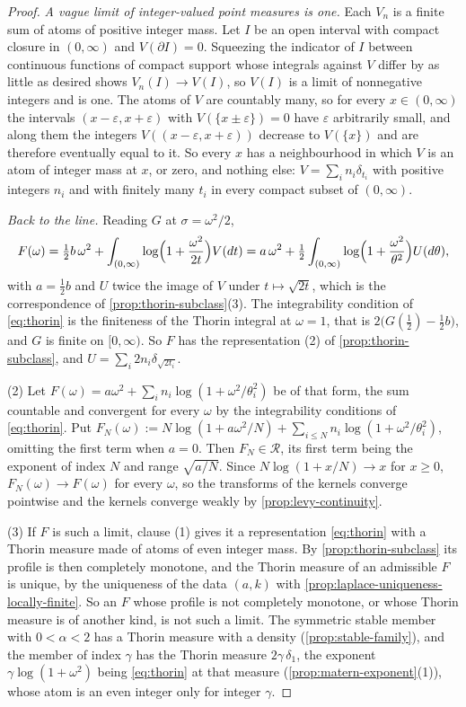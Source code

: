 \begin{proof}
\emph{A vague limit of integer-valued point measures is one.} Each $V_n$ is a finite sum of atoms
of positive integer mass. Let $I$ be an open interval with compact closure in $(0,\infty)$ and
$V(\partial I) = 0$. Squeezing the indicator of $I$ between continuous functions of compact
support whose integrals against $V$ differ by as little as desired shows $V_n(I) \to V(I)$, so
$V(I)$ is a limit of nonnegative integers and is one. The atoms of $V$ are countably many, so
for every $x \in (0,\infty)$ the intervals $(x - \varepsilon, x + \varepsilon)$ with
$V(\{x \pm \varepsilon\}) = 0$ have $\varepsilon$ arbitrarily small, and along them the integers
$V((x-\varepsilon,x+\varepsilon))$ decrease to $V(\{x\})$ and are therefore eventually equal to
it. So every $x$ has a neighbourhood in which $V$ is an atom of integer mass at $x$, or zero,
and nothing else: $V = \sum_i n_i\delta_{t_i}$ with positive integers $n_i$ and with finitely
many $t_i$ in every compact subset of $(0,\infty)$.

\emph{Back to the line.} Reading $G$ at $\sigma = \omega^2/2$,
\[
  F(\omega) = \tfrac12 b\,\omega^2 + \int_{(0,\infty)}\log\Bigl(1 + \frac{\omega^2}{2t}\Bigr)V(dt)
   = a\,\omega^2 + \tfrac12\int_{(0,\infty)}\log\Bigl(1 + \frac{\omega^2}{\theta^2}\Bigr)U(d\theta),
\]
with $a = \tfrac12 b$ and $U$ twice the image of $V$ under $t \mapsto \sqrt{2t}$, which is the
correspondence of \ref{prop:thorin-subclass}(3). The integrability condition of \ref{eq:thorin} is
the finiteness of the Thorin integral at $\omega = 1$, that is $2\bigl(G(\tfrac12) -
\tfrac12b\bigr)$, and $G$ is finite on $[0,\infty)$. So $F$ has the representation (2) of
\ref{prop:thorin-subclass}, and $U = \sum_i 2n_i\delta_{\sqrt{2t_i}}$.

(2) Let $F(\omega) = a\omega^2 + \sum_i n_i\log(1 + \omega^2/\theta_i^2)$ be of that form, the sum
countable and convergent for every $\omega$ by the integrability conditions of \ref{eq:thorin}.
Put $F_N(\omega) := N\log(1 + a\omega^2/N) + \sum_{i \le N} n_i\log(1 + \omega^2/\theta_i^2)$,
omitting the first term when $a = 0$. Then $F_N \in \mathcal{R}$, its first term being the
\Matern{} exponent of index $N$ and range $\sqrt{a/N}$. Since $N\log(1 + x/N) \to x$ for
$x \ge 0$, $F_N(\omega) \to F(\omega)$ for every $\omega$, so the transforms of the kernels
converge pointwise and the kernels converge weakly by \ref{prop:levy-continuity}.

(3) If $F$ is such a limit, clause (1) gives it a representation \ref{eq:thorin} with a Thorin
measure made of atoms of even integer mass. By \ref{prop:thorin-subclass} its profile is then
completely monotone, and the Thorin measure of an admissible $F$ is unique, by the uniqueness
of the data $(a,k)$ with \ref{prop:laplace-uniqueness-locally-finite}. So an $F$ whose profile
is not completely monotone, or whose Thorin measure is of another kind, is not such a limit.
The symmetric stable member with $0 < \alpha < 2$ has a Thorin measure with a density
(\ref{prop:stable-family}), and the \Matern{} member of index $\gamma$ has the Thorin measure
$2\gamma\,\delta_1$, the exponent $\gamma\log(1+\omega^2)$ being \ref{eq:thorin} at that measure
(\ref{prop:matern-exponent}(1)), whose atom is an even integer only for integer $\gamma$.


\end{proof}
